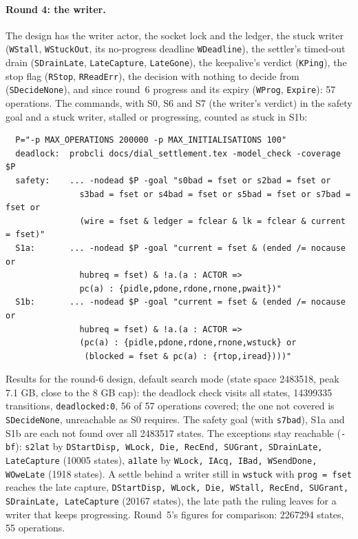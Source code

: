 \documentclass[a4paper,10pt,fleqn]{article}
\begin{document}
\paragraph{Round 4: the writer.}
The design has the writer actor, the socket lock and the ledger, the stuck
writer (\texttt{WStall}, \texttt{WStuckOut}, its no-progress deadline
\texttt{WDeadline}), the settler's timed-out drain (\texttt{SDrainLate},
\texttt{LateCapture}, \texttt{LateGone}), the keepalive's verdict
(\texttt{KPing}), the stop flag (\texttt{RStop}, \texttt{RReadErr}), the decision
with nothing to decide from (\texttt{SDecideNone}), and since round~6 progress and
its expiry (\texttt{WProg}, \texttt{Expire}): 57 operations.  The commands, with
S0, S6 and S7 (the writer's verdict) in the safety goal and a stuck writer, stalled or progressing,
counted as stuck in S1b:
\begin{verbatim}
  P="-p MAX_OPERATIONS 200000 -p MAX_INITIALISATIONS 100"
  deadlock:  probcli docs/dial_settlement.tex -model_check -coverage $P
  safety:    ... -nodead $P -goal "s0bad = fset or s2bad = fset or
               s3bad = fset or s4bad = fset or s5bad = fset or s7bad = fset or
               (wire = fset & ledger = fclear & lk = fclear & current = fset)"
  S1a:       ... -nodead $P -goal "current = fset & (ended /= nocause or
               hubreq = fset) & !a.(a : ACTOR =>
               pc(a) : {pidle,pdone,rdone,rnone,pwait})"
  S1b:       ... -nodead $P -goal "current = fset & (ended /= nocause or
               hubreq = fset) & !a.(a : ACTOR =>
               (pc(a) : {pidle,pdone,rdone,rnone,wstuck} or
                (blocked = fset & pc(a) : {rtop,iread})))"
\end{verbatim}
Results for the round-6 design, default search mode (state space 2483518, peak
7.1 GB, close to the 8 GB cap): the deadlock check visits all states, 14399335
transitions, \texttt{deadlocked:0}, 56 of 57 operations covered; the one not
covered is \texttt{SDecideNone}, unreachable as S0 requires.  The safety goal
(with \texttt{s7bad}), S1a and S1b are each not found over all 2483517 states.
The exceptions stay reachable (\texttt{-bf}): \texttt{s2lat} by
\texttt{DStartDisp, WLock, Die, RecEnd, SUGrant, SDrainLate, LateCapture} (10005
states), \texttt{a1late} by \texttt{WLock, IAcq, IBad, WSendDone, WOweLate}
(1918 states).  A settle behind a writer still in \texttt{wstuck} with
\texttt{prog = fset} reaches the late capture, \texttt{DStartDisp, WLock, Die,
WStall, RecEnd, SUGrant, SDrainLate, LateCapture} (20167 states), the late path
the ruling leaves for a writer that keeps progressing.  Round~5's figures for
comparison: 2267294 states, 55 operations.
\end{document}
